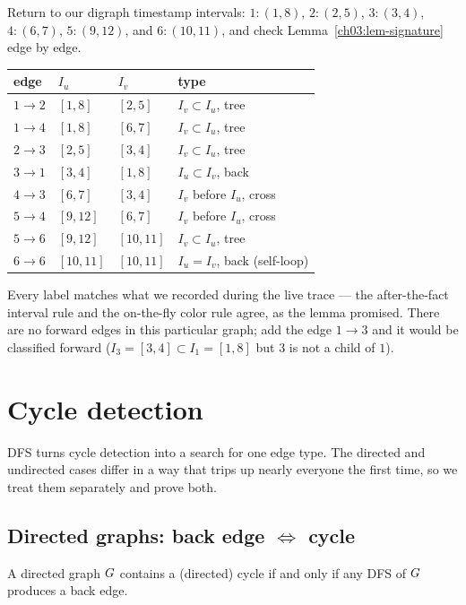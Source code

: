 Return to our digraph timestamp intervals:
$1{:}(1,8)$, $2{:}(2,5)$, $3{:}(3,4)$, $4{:}(6,7)$, $5{:}(9,12)$, and $6{:}(10,11)$,
and check Lemma~\ref{ch03:lem-signature} edge by edge.

\begin{center}
\begin{tabular}{@{}llll@{}}
\toprule
edge & $I_u$ & $I_v$ & type \\
\midrule
$1\to2$ & $[1,8]$ & $[2,5]$ & $I_v\subset I_u$, tree \\
$1\to4$ & $[1,8]$ & $[6,7]$ & $I_v\subset I_u$, tree \\
$2\to3$ & $[2,5]$ & $[3,4]$ & $I_v\subset I_u$, tree \\
$3\to1$ & $[3,4]$ & $[1,8]$ & $I_u\subset I_v$, back \\
$4\to3$ & $[6,7]$ & $[3,4]$ & $I_v$ before $I_u$, cross \\
$5\to4$ & $[9,12]$ & $[6,7]$ & $I_v$ before $I_u$, cross \\
$5\to6$ & $[9,12]$ & $[10,11]$ & $I_v\subset I_u$, tree \\
$6\to6$ & $[10,11]$ & $[10,11]$ & $I_u=I_v$, back (self-loop) \\
\bottomrule
\end{tabular}
\end{center}

Every label matches what we recorded during the live trace --- the after-the-fact interval rule and the on-the-fly color rule agree, as the lemma promised. There are no forward edges in this particular graph; add the edge $1\to3$ and it would be classified forward ($I_3=[3,4]\subset I_1=[1,8]$ but $3$ is not a child of $1$).

\section{Cycle detection}
\label{ch03:cycles}

DFS turns cycle detection into a search for one edge type. The directed and undirected cases differ in a way that trips up nearly everyone the first time, so we treat them separately and prove both.

\subsection{Directed graphs: back edge $\iff$ cycle}

\begin{theorem}\label{ch03:thm-dircycle}
A directed graph $G$ contains a (directed) cycle if and only if any DFS of $G$ produces a back edge.
\end{theorem}

